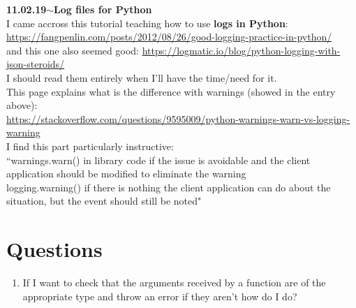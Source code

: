 \documentclass[11pt,a4paper]{article}
\newenvironment{loggentry}[2]%
{\noindent\textbf{#1}\hspace{1cm}$\mathbf{\sim}$\text{ }\textbf{#2}\\}{\vspace{0.5cm}}
\begin{document}
\begin{loggentry}{11.02.19}{Log files for Python}

I came accross this tutorial teaching how to use \textbf{logs in Python}:\\
\url{https://fangpenlin.com/posts/2012/08/26/good-logging-practice-in-python/}\\
and this one also seemed good:
\url{https://logmatic.io/blog/python-logging-with-json-steroids/}\\
I should read them entirely when I'll have the time/need for it.\\
This page explains what is the difference with warnings (showed in the entry above):\\
\url{https://stackoverflow.com/questions/9595009/python-warnings-warn-vs-logging-warning}\\
I find this part particularly instructive:\\
\indent ``warnings.warn() in library code if the issue is avoidable and the client application should be modified to eliminate the warning\\
\indent logging.warning() if there is nothing the client application can do about the situation, but the event should still be noted"\\

\end{loggentry}

\section{Questions}
\begin{enumerate}
\item If I want to check that the arguments received by a function are of the appropriate type and throw an error if they aren't how do I do?
\end{enumerate}
\end{document}
